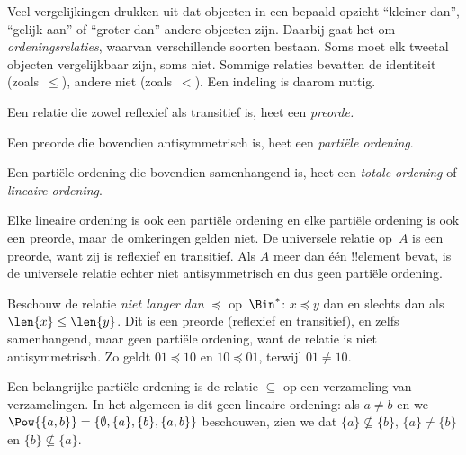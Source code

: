 \documentclass[../../../include/open-logic-section]{subfiles}
\begin{document}

\begin{explain}
Veel vergelijkingen drukken uit dat objecten in een bepaald opzicht
``kleiner dan'', ``gelijk aan'' of ``groter dan'' andere objecten zijn. Daarbij
gaat het om \emph{ordeningsrelaties}, waarvan verschillende soorten bestaan.
Soms moet elk tweetal objecten vergelijkbaar zijn, soms niet. Sommige relaties
bevatten de identiteit (zoals~$\le$), andere niet (zoals~$<$). Een indeling is
daarom nuttig.
\end{explain}

\begin{defn}[Preorde]
Een relatie die zowel reflexief als transitief is, heet een
\emph{preorde.}  
\end{defn}

\begin{defn}
Een preorde die bovendien antisymmetrisch is, heet een
\emph{partiële ordening}.
\end{defn}

\begin{defn}
Een partiële ordening die bovendien samenhangend is, heet een
\emph{totale ordening} of \emph{lineaire ordening}.
\end{defn}

\begin{ex}
Elke lineaire ordening is ook een partiële ordening en elke partiële ordening is
ook een preorde, maar de omkeringen gelden niet. De universele relatie
op~$A$ is een preorde, want zij is reflexief en transitief. Als
$A$ meer dan één !!{element} bevat, is de universele relatie echter niet
antisymmetrisch en dus geen partiële ordening.
\end{ex}

\begin{ex}
Beschouw de relatie \emph{niet langer dan} $\preccurlyeq$ op~$\Bin^*$:
$x \preccurlyeq y$ dan en slechts dan als $\len{x} \le \len{y}$. Dit is een
preorde (reflexief en transitief), en zelfs samenhangend, maar geen partiële
ordening, want de relatie is niet antisymmetrisch. Zo geldt $01
\preccurlyeq 10$ en $10 \preccurlyeq 01$, terwijl $01 \neq 10$.
\end{ex}

\begin{ex}
Een belangrijke partiële ordening is de relatie $\subseteq$ op een verzameling
van verzamelingen. In het algemeen is dit geen lineaire ordening: als $a \neq b$
en we $\Pow{\{a, b\}} = \{\emptyset, \{a\}, \{b\}, \{a,b\}\}$ beschouwen,
zien we dat $\{a\} \nsubseteq \{b\}$, $\{a\} \neq \{b\}$ en $\{b\}
\nsubseteq \{a\}$.
\end{ex}
\end{document}
